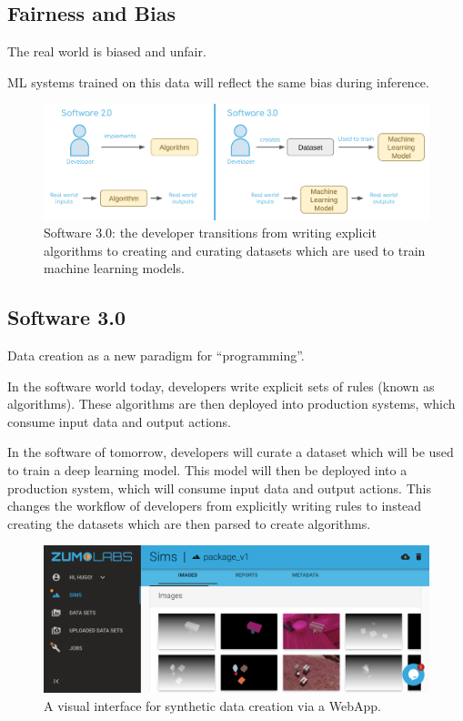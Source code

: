 \documentclass{article}
\begin{document}
\subsection{Fairness and Bias}

The real world is biased and unfair.

ML systems trained on this data will reflect the same bias during inference.

\begin{figure}
	\centering
	\includegraphics[width=\textwidth]{software3.png}
	\caption{Software 3.0: the developer transitions from writing explicit algorithms to creating and curating datasets which are used to train machine learning models.}
	\label{fig:fig2}
\end{figure}

\subsection{Software 3.0}
\label{sec:software3.0}

Data creation as a new paradigm for “programming”.

In the software world today, developers write explicit sets of rules (known as algorithms). These algorithms are then deployed into production systems, which consume input data and output actions.

In the software of tomorrow, developers will curate a dataset which will be used to train a deep learning model. This model will then be deployed into a production system, which will consume input data and output actions. This changes the workflow of developers from explicitly writing rules to instead creating the datasets which are then parsed to create algorithms.

\begin{figure}
	\centering
	\includegraphics[width=\textwidth]{webapp.png}
	\caption{A visual interface for synthetic data creation via a WebApp.}
	\label{fig:webapp}
\end{figure}
\end{document}
